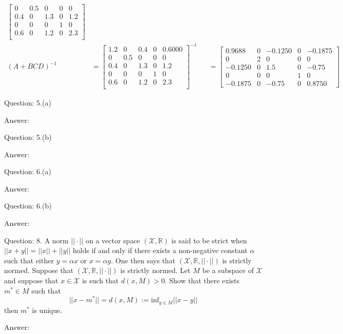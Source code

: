 \documentclass[a4paper]{article}
\begin{document}
\begin{qalist}
\begin{align}
\begin{bmatrix}
						0 & 0.5 & 0 & 0 & 0 \\
						0.4 & 0 & 1.3 & 0 & 1.2 \\
						0 & 0 & 0 & 1 & 0 \\
						0.6 & 0 & 1.2 & 0 & 2.3 \\
					\end{bmatrix} \\
				{(A + BCD)}^{-1} &= {\begin{bmatrix}
						1.2 & 0 & 0.4 & 0 & 0.6000 \\
						0 & 0.5 & 0 & 0 & 0 \\
						0.4 & 0 & 1.3 & 0 & 1.2 \\
						0 & 0 & 0 & 1 & 0 \\
						0.6 & 0 & 1.2 & 0 & 2.3 \\
					\end{bmatrix}}^{-1} &&= \begin{bmatrix}
						0.9688 & 0 & -0.1250 & 0 & -0.1875 \\
						0 & 2 & 0 & 0 & 0 \\
						-0.1250 & 0 & 1.5 & 0 & -0.75 \\
						0 & 0 & 0 & 1 & 0 \\
						-0.1875 & 0 & -0.75 & 0& 0.8750
					\end{bmatrix}
			\end{align}
			
		\item[Question: 5.(a)] \setcounter{equation}{0}
		\item[Answer:] 	
		\item[Question: 5.(b)] \setcounter{equation}{0}
		\item[Answer:] 	
		\item[Question: 6.(a)] \setcounter{equation}{0}
		\item[Answer:] 	
		\item[Question: 6.(b)] \setcounter{equation}{0}
		\item[Answer:] 	
		\item[Question: 8.] \setcounter{equation}{0} A norm $||\cdot||$ on a vector space $(\mathcal{X}, \mathbb{R})$ is said to be strict when $||x+y|| = ||x|| + ||y||$ holds if and only if there exists a non-negative constant $\alpha$ such that either $y = \alpha x$ or $x = \alpha y$. One then says that $(\mathcal{X}, \mathbb{R}, ||\cdot||)$ is strictly normed. Suppose that $(\mathcal{X}, \mathbb{R}, ||\cdot||)$ is strictly normed. Let $M$ be a subspace of $\mathcal{X}$ and suppose that $x \in \mathcal{X}$ is such that $d(x,M) > 0$. Show that there exists ${m}^{*} \in M$ such that \[||x - {m}^{*}|| = d(x,M) := \text{inf}_{y\in M} ||x-y||\] then ${m}^{*}$ is unique.
		\item[Answer:] 	
		

\end{qalist}
\end{document}
